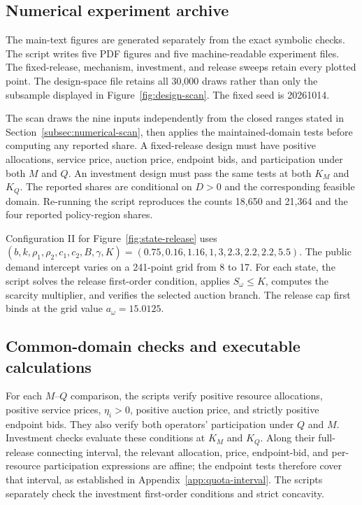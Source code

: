 \subsection{Numerical experiment archive}\label{app:numerical-archive}

The main-text figures are generated separately from the exact symbolic checks. The script  writes five PDF figures and five machine-readable experiment files. The fixed-release, mechanism, investment, and release sweeps retain every plotted point. The design-space file retains all 30,000 draws rather than only the subsample displayed in Figure~\ref{fig:design-scan}. The fixed seed is 20261014.

The scan draws the nine inputs independently from the closed ranges stated in Section~\ref{subsec:numerical-scan}, then applies the maintained-domain tests before computing any reported share. A fixed-release design must have positive allocations, service price, auction price, endpoint bids, and participation under both $M$ and $Q$. An investment design must pass the same tests at both $K_M$ and $K_Q$. The reported shares are conditional on $D>0$ and the corresponding feasible domain. Re-running the script reproduces the counts 18,650 and 21,364 and the four reported policy-region shares.

Configuration II for Figure~\ref{fig:state-release} uses $(b,k,\rho_1,\rho_2,c_1,c_2,B,\gamma,K)=(0.75,0.16,1.16,1,3,2.3,2.2,2.2,5.5)$. The public demand intercept varies on a 241-point grid from 8 to 17. For each state, the script solves the release first-order condition, applies $S_\omega\leq K$, computes the scarcity multiplier, and verifies the selected auction branch. The release cap first binds at the grid value $a_\omega=15.0125$.

\subsection{Common-domain checks and executable calculations}

For each $M$--$Q$ comparison, the scripts verify positive resource allocations, positive service prices, $\eta_i>0$, positive auction price, and strictly positive endpoint bids. They also verify both operators' participation under $Q$ and $M$. Investment checks evaluate these conditions at $K_M$ and $K_Q$. Along their full-release connecting interval, the relevant allocation, price, endpoint-bid, and per-resource participation expressions are affine; the endpoint tests therefore cover that interval, as established in Appendix~\ref{app:quota-interval}. The scripts separately check the investment first-order conditions and strict concavity.

